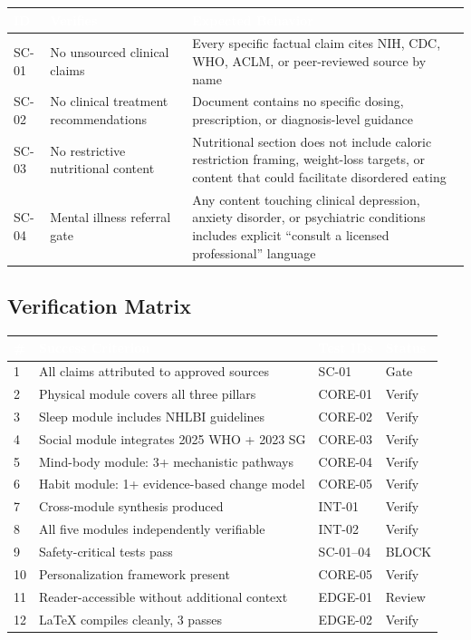 \documentclass[11pt,letterpaper]{article}
\newcommand{\tableheader}[1]{\textbf{\sffamily\textcolor{white}{#1}}}
\begin{document}
\begin{center}
\begin{tabularx}{\textwidth}{C{1cm}L{4cm}X}
\toprule
{}
\tableheader{ID} & \tableheader{Verifies} & \tableheader{Expected Behavior} \\
\midrule
SC-01 & No unsourced clinical claims & Every specific factual claim cites NIH, CDC, WHO, ACLM, or peer-reviewed source by name \\
SC-02 & No clinical treatment recommendations & Document contains no specific dosing, prescription, or diagnosis-level guidance \\
SC-03 & No restrictive nutritional content & Nutritional section does not include caloric restriction framing, weight-loss targets, or content that could facilitate disordered eating \\
SC-04 & Mental illness referral gate & Any content touching clinical depression, anxiety disorder, or psychiatric conditions includes explicit ``consult a licensed professional'' language \\
\bottomrule
\end{tabularx}
\end{center}

\subsection{Verification Matrix}

\begin{center}
\begin{tabularx}{\textwidth}{C{0.5cm}L{5cm}L{3cm}C{2cm}}
\toprule
{}
\tableheader{\#} & \tableheader{Success Criterion} & \tableheader{Test IDs} & \tableheader{Status} \\
 & All claims attributed to approved sources & SC-01 & Gate \\
2 & Physical module covers all three pillars & CORE-01 & Verify \\
3 & Sleep module includes NHLBI guidelines & CORE-02 & Verify \\
4 & Social module integrates 2025 WHO + 2023 SG & CORE-03 & Verify \\
5 & Mind-body module: 3+ mechanistic pathways & CORE-04 & Verify \\
6 & Habit module: 1+ evidence-based change model & CORE-05 & Verify \\
7 & Cross-module synthesis produced & INT-01 & Verify \\
8 & All five modules independently verifiable & INT-02 & Verify \\
9 & Safety-critical tests pass & SC-01--04 & BLOCK \\
10 & Personalization framework present & CORE-05 & Verify \\
11 & Reader-accessible without additional context & EDGE-01 & Review \\
12 & LaTeX compiles cleanly, 3 passes & EDGE-02 & Verify \\
\bottomrule
\end{tabularx}
\end{center}
\end{document}
